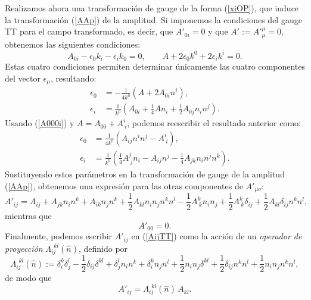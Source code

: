 Realizamos ahora una transformación de gauge de la forma (\ref{xiOP}), que induce la transformación (\ref{AAp}) de la amplitud. Si imponemos la condiciones del gauge TT para el campo transformado, es decir, que $A'_{0i}=0$ y que $A':=A'^\mu_{ \mu}=0$, obtenemos las siguientes condiciones:
\begin{equation}
A_{0i}-\epsilon_0k_i-\epsilon_ik_0=0, \qquad
A+2\epsilon_0k^0+2\epsilon_ik^i=0.
\end{equation}
Estas cuatro condiciones permiten determinar únicamente las cuatro componentes del vector $\epsilon_\mu$, resultando:
\begin{align}
\epsilon_0 &= -\frac{1}{4k^0}\left(A+2A_{0i}n^i\right) ,\\
\epsilon_i &= \frac{1}{k^0}\left(A_{0i}+\frac{1}{4}An_i+\frac{1}{2}A_{0j}n_in^j\right).
\end{align}
Usando (\ref{A000i}) y $A=A_{00}+A^i_{\ i}$, podemos reescribir el resultado anterior como:
\begin{align}
\epsilon_0 &= \frac{1}{4k^0}\left(A_{ij}n^in^j-A^i_{\ i}\right) ,\\
\epsilon_i &= \frac{1}{k^0}\left(\frac{1}{4}A^j_{\ j}n_i-A_{ij}n^j-\frac{1}{4}A_{jk}n_in^jn^k\right).
\end{align}
Sustituyendo estos parámetros en la transformación de gauge de la amplitud (\ref{AAp}), obtenemos una expresión para las otras componentes de $A'_{\mu\nu}$:
\begin{equation}\label{AijTT}
A'_{ij} = A_{ij}+A_{jk}n_in^k+A_{ik}n_jn^k+\frac{1}{2}A_{kl}n_in_jn^kn^l-\frac{1}{2}A^k_{\ k}n_in_j+\frac{1}{2}A^k_{\ k}\delta_{ij}+\frac{1}{2}A_{kl}\delta_{ij}n^kn^l,
\end{equation}
mientras que
\begin{equation}
A'_{00} = 0.
\end{equation}
Finalmente, podemos escribir $A'_{ij}$ en (\ref{AijTT}) como la acción de un \textit{operador de proyección} $\Lambda_{ij}^{\ \ kl}(\hat{n})$, definido por
\begin{equation}
\boxed{\Lambda_{ij}^{\ \ kl}(\hat{n}):=\delta^k_i\delta^l_j-\frac{1}{2}\delta_{ij}\delta^{kl}+\delta^l_jn_in^k+\delta^k_in_jn^l +\frac{1}{2}n_in_j\delta^{kl} +\frac{1}{2}\delta_{ij}n^kn^l
+\frac{1}{2}n_in_jn^kn^l,}
\end{equation}
de modo que
\begin{equation}
\boxed{A'_{ij}=\Lambda_{ij}^{\ \ kl}(\hat{n})\,A_{kl}.}
\end{equation}

